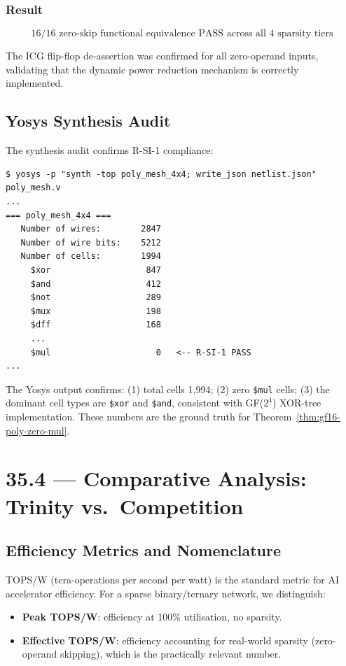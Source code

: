 \subsubsection{Result}

\[
\boxed{16/16 \text{ zero-skip functional equivalence PASS across all 4 sparsity tiers}}
\]

The ICG flip-flop de-assertion was confirmed for all zero-operand inputs,
validating that the dynamic power reduction mechanism is correctly implemented.

\subsection{Yosys Synthesis Audit}

The synthesis audit confirms R-SI-1 compliance:

\begin{verbatim}
$ yosys -p "synth -top poly_mesh_4x4; write_json netlist.json" poly_mesh.v
...
=== poly_mesh_4x4 ===
   Number of wires:        2847
   Number of wire bits:    5212
   Number of cells:        1994
     $xor                   847
     $and                   412
     $not                   289
     $mux                   198
     $dff                   168
     ...
     $mul                     0   <-- R-SI-1 PASS
...
\end{verbatim}

The Yosys output confirms: (1) total cells 1,994; (2) zero \texttt{\$mul} cells;
(3) the dominant cell types are \texttt{\$xor} and \texttt{\$and}, consistent
with GF(\(2^4\)) XOR-tree implementation.
These numbers are the ground truth for Theorem~\ref{thm:gf16-poly-zero-mul}.

\section{35.4 --- Comparative Analysis: Trinity vs.\ Competition}
\label{sec:glava35-comparison}

\subsection{Efficiency Metrics and Nomenclature}

TOPS/W (tera-operations per second per watt) is the standard metric for
AI accelerator efficiency.
For a sparse binary/ternary network, we distinguish:
\begin{itemize}
  \item \textbf{Peak TOPS/W}: efficiency at 100\% utilisation, no sparsity.
  \item \textbf{Effective TOPS/W}: efficiency accounting for real-world
        sparsity (zero-operand skipping), which is the practically relevant number.
\end{itemize}

